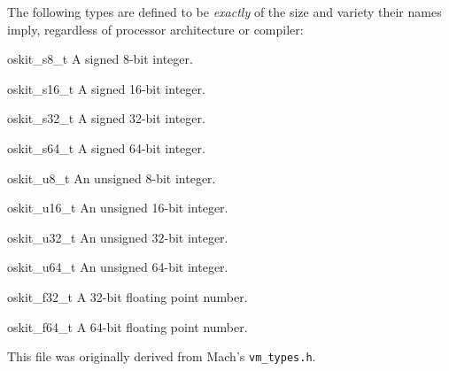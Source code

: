 {\begin{apidesc}
	The following types are defined to be \emph{exactly}
	of the size and variety their names imply,
	regardless of processor architecture or compiler:
	\begin{icsymlist}
	\item[oskit_s8_t]	A signed 8-bit integer.
	\item[oskit_s16_t]	A signed 16-bit integer.
	\item[oskit_s32_t]	A signed 32-bit integer.
	\item[oskit_s64_t]	A signed 64-bit integer.
	\item[oskit_u8_t]	An unsigned 8-bit integer.
	\item[oskit_u16_t]	An unsigned 16-bit integer.
	\item[oskit_u32_t]	An unsigned 32-bit integer.
	\item[oskit_u64_t]	An unsigned 64-bit integer.
	\item[oskit_f32_t]	A 32-bit floating point number.
	\item[oskit_f64_t]	A 64-bit floating point number.
	\end{icsymlist}

	This file was originally derived from Mach's {\tt vm_types.h}.
\end{apidesc}
}

